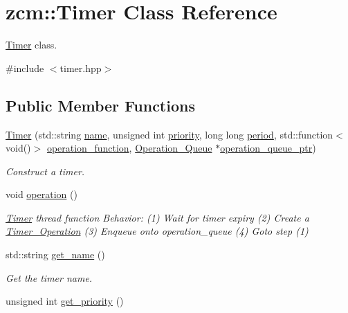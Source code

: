 \hypertarget{classzcm_1_1Timer}{}\section{zcm\+:\+:Timer Class Reference}
\label{classzcm_1_1Timer}


\hyperlink{classzcm_1_1Timer}{Timer} class.  




{\ttfamily \#include $<$timer.\+hpp$>$}

\subsection*{Public Member Functions}
\begin{DoxyCompactItemize}
\item 
\hyperlink{classzcm_1_1Timer_a1283d5045e825f0f07c1cf3117eb1904}{Timer} (std\+::string \hyperlink{classzcm_1_1Timer_abfd2bb014b496ce2eda5a5837e9275f1}{name}, unsigned int \hyperlink{classzcm_1_1Timer_a722f6390254d106117d8e1545b6092ab}{priority}, long long \hyperlink{classzcm_1_1Timer_a36c7498a7ad5706ceca83429e6c1759c}{period}, std\+::function$<$ void()$>$ \hyperlink{classzcm_1_1Timer_a07f820c2d67029b83547bbfd77fc3690}{operation\+\_\+function}, \hyperlink{classzcm_1_1Operation__Queue}{Operation\+\_\+\+Queue} $\ast$\hyperlink{classzcm_1_1Timer_a9f2ce34fb9230c4251355fde956b7220}{operation\+\_\+queue\+\_\+ptr})
\begin{DoxyCompactList}\small\item\em Construct a timer. \end{DoxyCompactList}\item 
void \hyperlink{classzcm_1_1Timer_a4baed4e019656ed2612aaa0374cc0fa9}{operation} ()
\begin{DoxyCompactList}\small\item\em \hyperlink{classzcm_1_1Timer}{Timer} thread function Behavior\+: (1) Wait for timer expiry (2) Create a \hyperlink{classzcm_1_1Timer__Operation}{Timer\+\_\+\+Operation} (3) Enqueue onto operation\+\_\+queue (4) Goto step (1) \end{DoxyCompactList}\item 
std\+::string \hyperlink{classzcm_1_1Timer_a4a4aaf655539dec8ca7e747e230f8655}{get\+\_\+name} ()
\begin{DoxyCompactList}\small\item\em Get the timer name. \end{DoxyCompactList}\item 
unsigned int \hyperlink{classzcm_1_1Timer_a468548503d67c3e3872cf85d86cb26ba}{get\+\_\+priority} ()

\end{DoxyCompactItemize}
